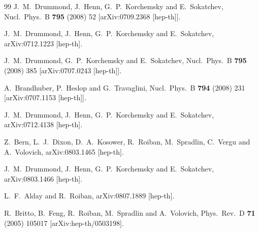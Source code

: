 \documentclass[12pt]{article}
\begin{document}
{\begin{thebibliography}{99}
  J.~M.~Drummond, J.~Henn, G.~P.~Korchemsky and E.~Sokatchev,
  Nucl.\ Phys.\  B {\bf 795} (2008) 52
  [arXiv:0709.2368 [hep-th]].

  J.~M.~Drummond, J.~Henn, G.~P.~Korchemsky and E.~Sokatchev,
  arXiv:0712.1223 [hep-th].

  J.~M.~Drummond, G.~P.~Korchemsky and E.~Sokatchev,
  Nucl.\ Phys.\  B {\bf 795} (2008) 385
  [arXiv:0707.0243 [hep-th]].

  A.~Brandhuber, P.~Heslop and G.~Travaglini,
  Nucl.\ Phys.\  B {\bf 794} (2008) 231
  [arXiv:0707.1153 [hep-th]].

  J.~M.~Drummond, J.~Henn, G.~P.~Korchemsky and E.~Sokatchev,
  arXiv:0712.4138 [hep-th].

  Z.~Bern, L.~J.~Dixon, D.~A.~Kosower, R.~Roiban, M.~Spradlin, C.~Vergu and A.~Volovich,
  arXiv:0803.1465 [hep-th].

  J.~M.~Drummond, J.~Henn, G.~P.~Korchemsky and E.~Sokatchev,
  arXiv:0803.1466 [hep-th].

  L.~F.~Alday and R.~Roiban,
  arXiv:0807.1889 [hep-th].

  R.~Britto, B.~Feng, R.~Roiban, M.~Spradlin and A.~Volovich,
  Phys.\ Rev.\  D {\bf 71} (2005) 105017
  [arXiv:hep-th/0503198].


\end{thebibliography}}
\end{document}
